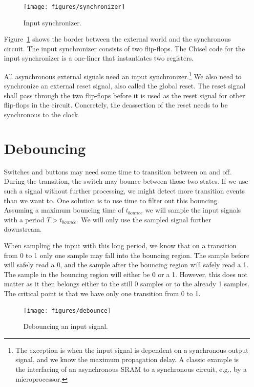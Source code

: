 \documentclass[%
    10pt,
    headinclude, footexclude,
    openright, %
    notitlepage,
    cleardoubleempty,
    headsepline,
    pointlessnumbers,
    bibtotoc, idxtotoc,
    ]{scrbook}
\begin{document}
\begin{figure}
  \centering
  \texttt{[image: figures/synchronizer]}
  \caption{Input synchronizer.}
  \label{fig:synchronizer}
\end{figure}

Figure~\ref{fig:synchronizer} shows the border between the external world
and the synchronous circuit. The input synchronizer consists of
two flip-flops. The Chisel code for the input synchronizer is a one-liner that
instantiates two registers.


All asynchronous external signals need an input
synchronizer.\footnote{The exception is when the input signal is dependent
on a synchronous output signal, and we know the maximum propagation delay.
A classic example is the interfacing of an asynchronous SRAM
to a synchronous circuit, e.g., by a microprocessor.}
We also need to synchronize an external reset signal, also called the global reset. The reset signal
shall pass through the two flip-flops before it is used as the reset signal
for other flip-flops in the circuit. Concretely, the deassertion of the reset needs
to be synchronous to the clock.

\section{Debouncing}

Switches and buttons may need some time to transition between on and off.
During the transition, the switch may bounce between those two states.
If we use such a signal without further processing, we might detect more
transition events than we want to. One solution is to use time to filter out
this bouncing. Assuming a maximum bouncing time of $t_{bounce}$ we will sample the
input signals with a period $T > t_{bounce}$. We will only use the
sampled signal further downstream.

When sampling the input with this long period, we know that on a transition
from 0 to 1 only one sample may fall into the bouncing region.
The sample before will safely read a 0, and the sample after the bouncing
region will safely read a 1. The sample in the bouncing region will
either be  0 or a 1. However, this does not matter as it then belongs either
to the still 0 samples or to the already 1 samples. The critical point
is that we have only one transition from 0 to 1.

\begin{figure}
  \centering
  \texttt{[image: figures/debounce]}
  \caption{Debouncing an input signal.}
  \label{fig:debounce}
\end{figure}
\end{document}
